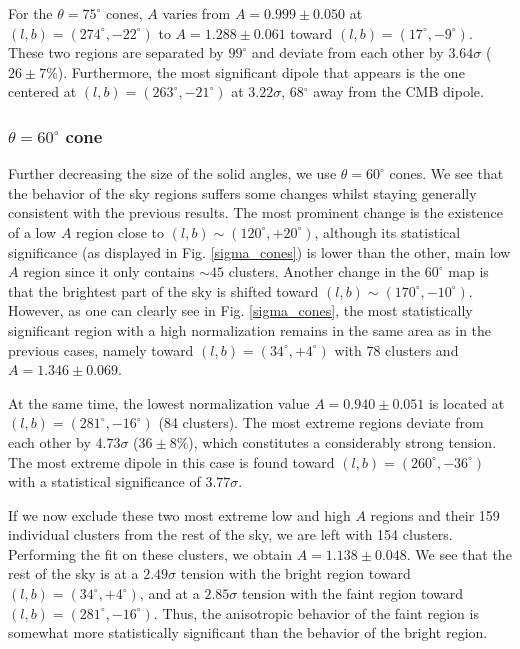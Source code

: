 \documentclass{aa}   %
\begin{document}
For the $\theta=75^{\circ}$ cones, $A$ varies from $A=0.999\pm 0.050$ at $(l,b)=(274^{\circ}, -22^{\circ})$ to $A=1.288\pm 0.061$ toward $(l,b)=(17^{\circ}, -9^{\circ})$. These two regions are separated by $99^{\circ}$ and deviate from each other by $3.64\sigma$ ($26\pm 7\%$). Furthermore, the most significant dipole that appears is the one centered at $(l,b)=(263^{\circ}, -21^{\circ})$ at $3.22\sigma$, 68$^{\circ}$ away from the CMB dipole. 

\subsubsection{$\theta=60^{\circ}$ cone}

Further decreasing the size of the solid angles, we use $\theta=60^{\circ}$ cones. We see that the behavior of the sky regions suffers some changes whilst staying generally consistent with the previous results. The most prominent change is the existence of a low $A$ region close to $(l,b)\sim (120^{\circ}, +20^{\circ})$, although its statistical significance (as displayed in Fig. \ref{sigma_cones})  is lower than the other, main low $A$ region since it only contains $\sim 45$ clusters. Another change in the $60^{\circ}$ map is that the brightest part of the sky is shifted toward $(l,b)\sim(170^{\circ},-10^{\circ})$. However, as one can clearly see in Fig. \ref{sigma_cones}, the most statistically significant region with a high normalization remains in the same area as in the previous cases, namely toward $(l,b)=(34^{\circ}, +4^{\circ})$ with 78 clusters and $A=1.346\pm 0.069$.

At the same time, the lowest normalization value $A=0.940\pm 0.051$ is located at $(l,b)=(281^{\circ}, -16^{\circ})$ (84 clusters). The most extreme regions deviate from each other by $4.73\sigma$ ($36\pm 8\%$), which constitutes a considerably strong tension. 
The most extreme dipole in this case is found toward $(l,b)=(260^{\circ}, -36^{\circ})$ with a statistical significance of $3.77\sigma$. 

If we now exclude these two most extreme low and high $A$ regions and their 159 individual clusters from the rest of the sky, we are left with 154 clusters. Performing the fit on these clusters, we obtain $A=1.138\pm 0.048$. We see that the rest of the sky is at a $2.49\sigma$ tension with the bright region toward $(l,b)=(34^{\circ}, +4^{\circ})$, and at a $2.85\sigma$ tension with the faint region toward $(l,b)=(281^{\circ}, -16^{\circ})$. Thus, the anisotropic behavior of the faint region is somewhat more statistically significant than the behavior of the bright region.
\end{document}
